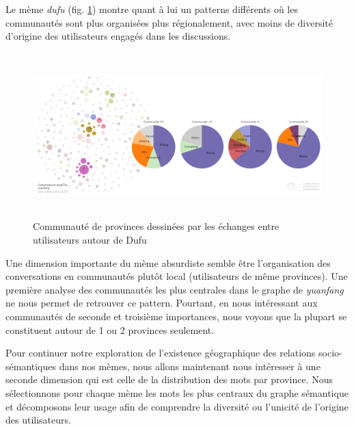 Le m\`eme \textit{dufu} (fig. \ref{fig:dufu-users-pie}) montre quant \`a lui un patterns diff\'erents
o\`u les communaut\'es sont plus organis\'ees plus r\'egionalement,
avec moins de diversit\'e d{\textquoteright}origine des utilisateurs
engag\'es dans les discussions.


\begin{figure}
    \centering

   \includegraphics[width=5.9996in,height=2.5004in]{figures/chap4/chapitre4-img58.png}
   
  \label{fig:dufu-users-pie}
    \caption{
        Communaut\'e de provinces dessin\'ees par les \'echanges entre utilisateurs autour de Dufu
    }

\end{figure}



Une dimension importante du m\`eme absurdiste semble \^etre
l{\textquoteright}organisation des conversations en communaut\'es
plut\^ot local (utilisateurs de m\^eme provinces). Une premi\`ere
analyse des communaut\'es les plus centrales dans le graphe de
\textit{yuanfang} ne nous permet de retrouver ce pattern. Pourtant, en
nous int\'eressant aux communaut\'es de seconde et troisi\`eme
importances, nous voyons que la plupart se constituent autour de 1 ou 2
provinces seulement. 


Pour continuer notre exploration de l{\textquoteright}existence
g\'eographique des relations socio-s\'emantiques dans nos m\`emes, nous
allons maintenant nous int\'eresser \`a une seconde dimension qui est
celle de la distribution des mots par province. Nous s\'electionnons
pour chaque m\`eme les mots les plus centraux du graphe s\'emantique et
d\'ecomposons leur usage afin de comprendre la diversit\'e ou
l{\textquoteright}unicit\'e de l{\textquoteright}origine des
utilisateurs.


